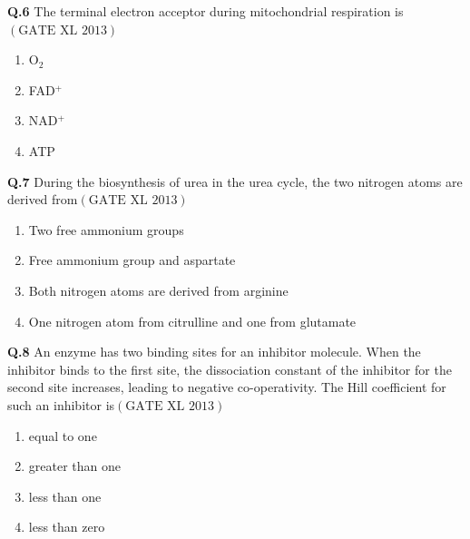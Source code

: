 \documentclass[12pt]{article}
\theoremstyle{remark}
\providecommand{\brak}[1]{\ensuremath{\left(#1\right)}}
\begin{document}
\textbf{Q.6} The terminal electron acceptor during mitochondrial respiration is\hfill $\brak{\text{GATE XL 2013}}$
\begin{enumerate}
    \item O$_2$
    \item FAD$^+$
    \item NAD$^+$
    \item ATP
\end{enumerate}

\textbf{Q.7} During the biosynthesis of urea in the urea cycle, the two nitrogen atoms are derived from\hfill $\brak{\text{GATE XL 2013}}$
\begin{enumerate}
    \item Two free ammonium groups
    \item Free ammonium group and aspartate
    \item Both nitrogen atoms are derived from arginine
    \item One nitrogen atom from citrulline and one from glutamate
\end{enumerate}

\textbf{Q.8} An enzyme has two binding sites for an inhibitor molecule. When the inhibitor binds to the first site, the dissociation constant of the inhibitor for the second site increases, leading to negative co-operativity. The Hill coefficient for such an inhibitor is\hfill $\brak{\text{GATE XL 2013}}$
\begin{enumerate}
    \item equal to one
    \item greater than one
    \item less than one
    \item less than zero
\end{enumerate}
\end{document}
